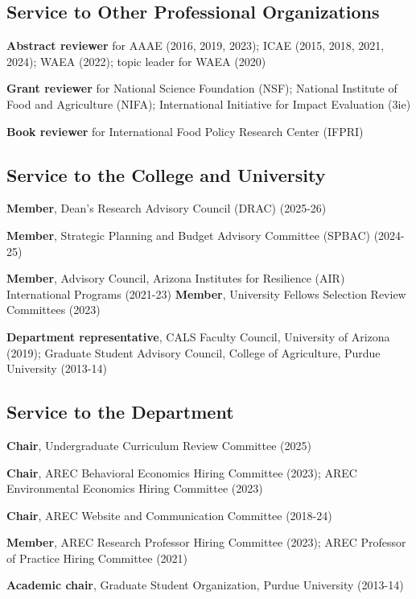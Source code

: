 \documentclass[letterpaper]{article}
\renewenvironment{itemize}{
  \begin{list}
  	{}{
    \setlength{\leftmargin}{1.5em}
    \setlength{\itemsep}{-.5em}
  }
}{
  \end{list}
}
\begin{document}
\subsection*{Service to Other Professional Organizations}
\begin{itemize}
\item \textbf{Abstract reviewer} for AAAE (2016, 2019, 2023); ICAE (2015, 2018, 2021, 2024); WAEA (2022); topic leader for WAEA (2020)
\item \textbf{Grant reviewer} for National Science Foundation (NSF); National Institute of Food and Agriculture (NIFA); International Initiative for Impact Evaluation (3ie)
\item \textbf{Book reviewer} for International Food Policy Research Center (IFPRI)
\end{itemize}

\subsection*{Service to the College and University}

\begin{itemize}
\item \textbf{Member}, Dean's Research Advisory Council (DRAC) (2025-26)
\item \textbf{Member}, Strategic Planning and Budget Advisory Committee (SPBAC) (2024-25)
\item \textbf{Member}, Advisory Council, Arizona Institutes for Resilience (AIR) International Programs (2021-23)
\textbf{Member}, University Fellows Selection Review Committees (2023)
\item \textbf{Department representative}, CALS Faculty Council, University of Arizona (2019); Graduate Student Advisory Council, College of Agriculture, Purdue University (2013-14)
\end{itemize}

\subsection*{Service to the Department}
\begin{itemize}
\item \textbf{Chair}, Undergraduate Curriculum Review Committee (2025)
\item \textbf{Chair}, AREC Behavioral Economics Hiring Committee (2023); AREC Environmental Economics Hiring Committee (2023)
\item \textbf{Chair}, AREC Website and Communication Committee (2018-24)
\item \textbf{Member}, AREC Research Professor Hiring Committee (2023); AREC Professor of Practice Hiring Committee (2021)
\item \textbf{Academic chair}, Graduate Student Organization, Purdue University (2013-14)
\end{itemize}
\end{document}
